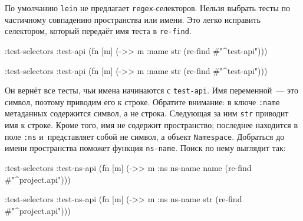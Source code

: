 По умолчанию \verb|lein| не предлагает \verb|regex|-селекторов. Нельзя выбрать
тесты по частичному совпадению пространства или имени. Это легко исправить
селектором, который передаёт имя теста в \verb|re-find|.

\ifnarrow

\begin{english}
  \begin{clojure}
:test-selectors
  {:test-api
   (fn [m]
     (->> m :name str
          (re-find #"^test-api")))}
  \end{clojure}
\end{english}

\else

\begin{english}
  \begin{clojure}
:test-selectors
  {:test-api
    (fn [m] (->> m :name str
                 (re-find #"^test-api")))}
  \end{clojure}
\end{english}

\fi

Он вернёт все тесты, чьи имена начинаются с \verb|test-api|. Имя переменной~---
это символ, поэтому приводим его к строке. Обратите внимание: в ключе
\verb|:name| метаданных содержится символ, а не строка. Следующая за ним
\verb|str| приводит имя к строке. Кроме того, имя не содержит пространство;
последнее находится в поле \verb|:ns| и~представляет собой не символ, а объект
\verb|Namespace|. Добраться до имени пространства поможет функция
\verb|ns-name|. Поиск по нему выглядит так:


\ifnarrow

\begin{english}
  \begin{clojure}
:test-selectors
  {:test-ns-api
   (fn [m]
     (->> m :ns ns-name name
          (re-find #"^project.api")))}
  \end{clojure}
\end{english}

\else

\begin{english}
  \begin{clojure}
:test-selectors
  {:test-ns-api
    (fn [m] (->> m :ns ns-name str
                 (re-find #"^project.api")))}
  \end{clojure}
\end{english}

